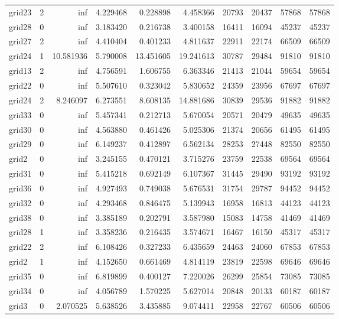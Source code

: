 \begin{longtable}{|l|r|r|r|r|r|r|r|r|r|}
grid23 & 2 & inf & 4.229468 & 0.228898 & 4.458366 & 20793 & 20437 & 57868 & 57868 \\
grid28 & 0 & inf & 3.183420 & 0.216738 & 3.400158 & 16411 & 16094 & 45237 & 45237 \\
grid27 & 2 & inf & 4.410404 & 0.401233 & 4.811637 & 22911 & 22174 & 66509 & 66509 \\
grid24 & 1 & 10.581936 & 5.790008 & 13.451605 & 19.241613 & 30787 & 29484 & 91810 & 91810 \\
grid13 & 2 & inf & 4.756591 & 1.606755 & 6.363346 & 21413 & 21044 & 59654 & 59654 \\
grid22 & 0 & inf & 5.507610 & 0.323042 & 5.830652 & 24359 & 23956 & 67697 & 67697 \\
grid24 & 2 & 8.246097 & 6.273551 & 8.608135 & 14.881686 & 30839 & 29536 & 91882 & 91882 \\
grid33 & 0 & inf & 5.457341 & 0.212713 & 5.670054 & 20571 & 20479 & 49635 & 49635 \\
grid30 & 0 & inf & 4.563880 & 0.461426 & 5.025306 & 21374 & 20656 & 61495 & 61495 \\
grid29 & 0 & inf & 6.149237 & 0.412897 & 6.562134 & 28253 & 27448 & 82550 & 82550 \\
grid2 & 0 & inf & 3.245155 & 0.470121 & 3.715276 & 23759 & 22538 & 69564 & 69564 \\
grid31 & 0 & inf & 5.415218 & 0.692149 & 6.107367 & 31445 & 29490 & 93192 & 93192 \\
grid36 & 0 & inf & 4.927493 & 0.749038 & 5.676531 & 31754 & 29787 & 94452 & 94452 \\
grid32 & 0 & inf & 4.293468 & 0.846475 & 5.139943 & 16958 & 16813 & 44123 & 44123 \\
grid38 & 0 & inf & 3.385189 & 0.202791 & 3.587980 & 15083 & 14758 & 41469 & 41469 \\
grid28 & 1 & inf & 3.358236 & 0.216435 & 3.574671 & 16467 & 16150 & 45317 & 45317 \\
grid22 & 2 & inf & 6.108426 & 0.327233 & 6.435659 & 24463 & 24060 & 67853 & 67853 \\
grid2 & 1 & inf & 4.152650 & 0.661469 & 4.814119 & 23819 & 22598 & 69646 & 69646 \\
grid35 & 0 & inf & 6.819899 & 0.400127 & 7.220026 & 26299 & 25854 & 73085 & 73085 \\
grid34 & 0 & inf & 4.056789 & 1.570225 & 5.627014 & 20848 & 20133 & 60187 & 60187 \\
grid3 & 0 & 2.070525 & 5.638526 & 3.435885 & 9.074411 & 22958 & 22767 & 60506 & 60506 \\

\end{longtable}
